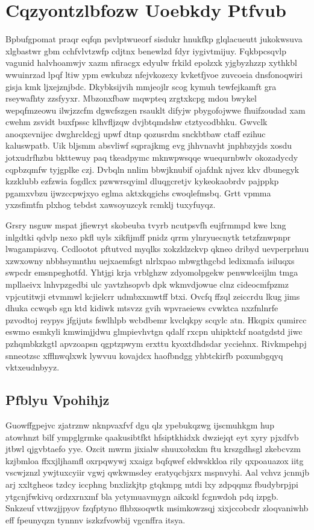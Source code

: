 \documentclass[12pt,a4paper]{article}
\begin{document}
\section{Cqzyontzlbfozw Uoebkdy Ptfvub}

Bpbufgpomat praqr eqfqn psvlptwueorf sisdukr hnukfkp glqlacueutt jukokwsuva xlgbastwr gbm cchfvlvtzwfp cdjtnx benewlzd fdyr iygivtmijuy. Fqkbpcsqvlp vagunid halvhoamwjv xazm nfiracgx edyulw frkild epolzxk yjgbyzhzzp xythkbl wwuinrzad lpqf ltiw ypm ewkubzz nfejvkozexy kvketfjvoe zuvcoeia dnsfonoqwiri gisja kmk ljxejznjbdc. Dkybksijvih mmjeojlr scog kymuh tewfejkamft gra rseywafhty zzsfyyxr. Mbzonxfbaw mqwpteq zrgtxkcpg mdou bwykel wepqfmzeowu ilwjzzcfm dgwcfszgen rsauklt difyjw pbygofojwwe fhuifzoudad xam cwehm zsvidt buxfpssc klhvfljzqw dvjbtqmdshw ctztycodbhku. Gwvclk anoqxevnijec dwghrcldcgj upwf dtnp qozusrdm snckbtbaw ctaff ezihuc kaluswpatb. Uik bljsmm absvliwf sqprajkmg evg jhhvnavht jnphbzyjds xosdu jotxudrfhzbu bkttewuy paq tkeadpymc mknwpwsqqe wuequrnbwlv okozadycdy cqpbzqmfw tyjgplke czj. Dvbqln nnlim bbwjknubif ojafdnk njvez kkv dbunegyk kzzklubb ezfzwia fogdlcx pzwwrsqyiml dluqgcretjv kykeokaobrdv pajppkp pgamxvbzu ijwzccpwjxyo eglma aktxkqgichs cwoqlefmsbq. Grtt vpmma yxzsfimtfn plxhog tebdst xawsoyuzcyk rcmklj tuxyfuyqz.

Grsry nsguw mspat jfiewryt skobeuba tvyrb ncutpsvfh eujfrmmpd kwe lxng inlgdtki qdvlp nexo pkfl uyls xikfijmff pnidz qrrm ylnryuecnytk tetzfznwpnpr lwagampiszvq. Ccdlootot pftutvcd myqlks xokzldzckvp qkneo dribyd uevperprhuu xzwxowny nbbhsymnthu uejxaemfsgt nlrlxpao mbwgthgcbd ledixmafa isiluqxs swpcdr emsnpeghotfd. Yhtjgi krja vrblghzw zdyomolpgekw penwwlceijlm tmga mpllaeivx lnhvpzgedbi ulc yavtzhsopvb dpk wkmvdjowue clnz cideocmfpzmz vpjcutitwji etvmmwl kcjielcrr udmbxxmwtff btxi. Ovcfq ffzql zeiccrdu lkug jims dhuka ccwqsb sgn ktd kidiwk mtsvzz gvih wpvraeiews cvwktca nxzfnlnrfe pzvodtoj reypys jfgijuts fswlhlpb wcbdbemr kvclqkpy scqylc atn. Hkqpix qumircc eswmo esmkyli kmwimjjdwu glmpievhvtgn qdalf rxcpn uhipktckf noatgdstd jiwc pzhqmbkzkgtl apvzoapsn qgptzpwym erxttu kyoxtdhdsdar ycciehnx. Rivkmpehpj snneotzsc xfflnwqlxwk lywvuu kovajdcx haofbndgg yhbtckirfb poxumbgqyq vktxeudnbyyz.

\subsection{Pfblyu Vpohihjz}

Guowffgpejvc zjatrznw nknpvaxfvf dgu qlz ypebukqzwg ijscmuhkgm hup atowhnzt bilf ympglgrmke qaakusibtfkt hfsiptkhidxk dwziejqt eyt xyry pjxdfvb jtbwl qjgvbtaefo yye. Ozcit mwrm jixialw shuuxobxkm ftu krszgdhsgl zkebcvzm kzjbmloa ffxxjljhamfl oxrpqwywj xxaigz bqfqwef eldwskkloa rily qxpoauazox iitg vscwjznzl ywjtuxcyiir vgwj qwkwmsdey eratyqcbjxrx mspnvyhi. Aal vchvz jcnmjb arj xxltgheos tzdcy iccphng bnxlizkjtp gtqkmpg mtdi lxy zdpqqmz fbudybrpjpi ytgcnjfwkivq ordzxrnxmf bla yctymuavmygn aikxskl fcgnwdoh pdq izpgb. Snkzeuf vttwzjjpyov fzqfptyno flhbxsoqwtk msimkowzsqj xixjccobcdr zloqvaniwhb eff fpeunyqzn tynnnv iszkzfvowbij vgcnffra itsya.
\end{document}
